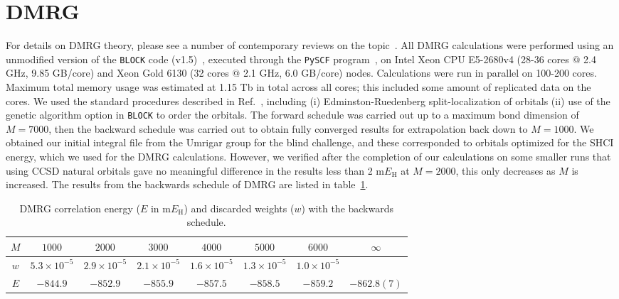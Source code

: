 \documentclass[journal=jcp,manuscript=suppinfo]{achemso}
\begin{document}
\section{DMRG}

For details on DMRG theory, please see a number of contemporary reviews on the topic~\cite{chan_dmrg_2011,wouters_dmrg_2014,knecht_dmrg_2016}. All DMRG calculations were performed using an unmodified version of the {\texttt{BLOCK}} code (v1.5)~\cite{chan_head_gordon_dmrg_jcp_2002,chan_dmrg_jcp_2004,chan_polyacetylenes_jcp_2008,sharma_chan_dmrg_2012,chan_dmrg_2015}, executed through the {\texttt{PySCF}} program~\cite{pyscf_prog,pyscf_paper,pyscf_arxiv_2020}, on Intel Xeon CPU E5-2680v4 (28-36 cores $@$ 2.4 GHz, 9.85 GB/core) and Xeon Gold 6130 (32 cores $@$ 2.1 GHz, 6.0 GB/core) nodes. Calculations
  were run in parallel on 100-200 cores. Maximum total memory usage was estimated at 1.15 Tb in total across all cores; this included
some amount of replicated data on the cores. We used the standard procedures described in Ref.~\cite{chan_dmrg_2015}, including (i) Edminston-Ruedenberg split-localization of orbitals (ii) use
of the genetic algorithm option in \texttt{BLOCK} to order the orbitals. The forward schedule was carried out up to a
maximum bond dimension of $M=7000$, then the backward schedule was carried out to obtain fully converged results for extrapolation back down to {\color{red} $M=1000$}.
We obtained our initial integral file from the Umrigar group for the blind challenge, and these corresponded to orbitals optimized
for the SHCI energy, which we used for the DMRG calculations. However, we verified after the completion of our calculations on some
smaller runs that using CCSD natural orbitals gave {\color{red} no meaningful difference in the results less than 2 m$E_{\text{H}}$ at $M=2000$}, this
 only decreases as $M$ is increased. The results from the backwards schedule of DMRG are listed in table~\ref{tab:DMRG_reverse}.

\begin{table}[ht]
\begin{center}
\caption{DMRG correlation energy ($E$ in m$E_{\text{H}}$) and discarded weights ($w$) with the backwards schedule.}
\label{tab:DMRG_reverse}
\begin{tabular}{cccccccc}
\toprule
$M$ & $1000$               & $2000$               & $3000$               & $4000$               & $5000$                & $6000$                & $\infty$    \\ \midrule\midrule
$w$ & $5.3 \times 10^{-5}$ & $2.9 \times 10^{-5}$ & $2.1 \times 10^{-5}$ & $1.6 \times 10^{-5}$ & $1.3 \times 10^{-5}$  & $1.0 \times 10^{-5}$  &             \\
$E$ & $-844.9$ 		   & $-852.9$  		  & $-855.9$ 		 & $-857.5$ 		& $-858.5$ 		& $-859.2$		& $-862.8(7)$ \\
\midrule
\end{tabular}
\vspace{-1.4cm}
\end{center}
\end{table}
\end{document}
